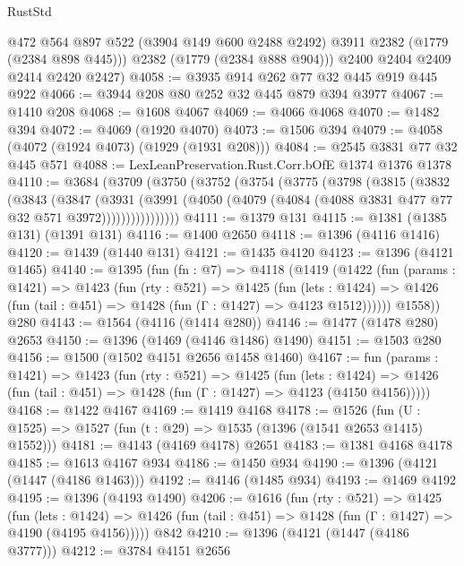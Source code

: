 \begin{lexlean}{RustStd}
\begin{coremodule}
{\begin{coremodule}
{{{{{{{{{{{          @472
          @564
          @897
          @522
          (@3904 @149 @600 @2488 @2492)
          @3911
          @2382
          (@1779 (@2384 @898 @445)))
        @2382
        (@1779 (@2384 @888 @904)))
      @2400
      @2404
      @2409
      @2414
      @2420
      @2427)
@4058 := @3935 @914 @262 @77 @32 @445 @919 @445 @922
@4066 := @3944 @208 @80 @252 @32 @445 @879 @394 @3977
@4067 := @1410 @208
@4068 := @1608 @4067
@4069 := @4066 @4068
@4070 := @1482 @394
@4072 := @4069 (@1920 @4070)
@4073 := @1506 @394
@4079 := @4058 (@4072 (@1924 @4073) (@1929 (@1931 @208)))
@4084 := @2545 @3831 @77 @32 @445 @571
@4088 := LexLeanPreservation.Rust.Corr.bOfE @1374 @1376 @1378
@4110 := @3684
    (@3709
      (@3750
        (@3752
          (@3754
            (@3775
              (@3798
                (@3815
                  (@3832
                    (@3843
                      (@3847
                        (@3931
                          (@3991
                            (@4050
                              (@4079 (@4084 (@4088 @3831 @477 @77 @32 @571 @3972))))))))))))))))
@4111 := @1379 @131
@4115 := @1381 (@1385 @131) (@1391 @131)
@4116 := @1400 @2650
@4118 := @1396 (@4116 @1416)
@4120 := @1439 (@1440 @131)
@4121 := @1435 @4120
@4123 := @1396 (@4121 @1465)
@4140 := @1395
    (fun (fn : @7) =>
    @4118
      (@1419
        (@1422
          (fun (params : @1421) =>
          @1423
            (fun (rty : @521) =>
            @1425
              (fun (lets : @1424) =>
              @1426 (fun (tail : @451) => @1428 (fun (Γ : @1427) => @4123 @1512))))))
        @1558))
    @280
@4143 := @1564 (@4116 (@1414 @280))
@4146 := @1477 (@1478 @280) @2653
@4150 := @1396 (@1469 (@4146 @1486) @1490)
@4151 := @1503 @280
@4156 := @1500 (@1502 @4151 @2656 @1458 @1460)
@4167 := fun (params : @1421) =>
  @1423
    (fun (rty : @521) =>
    @1425
      (fun (lets : @1424) =>
      @1426 (fun (tail : @451) => @1428 (fun (Γ : @1427) => @4123 (@4150 @4156)))))
@4168 := @1422 @4167
@4169 := @1419 @4168
@4178 := @1526 (fun (U : @1525) => @1527 (fun (t : @29) => @1535 (@1396 (@1541 @2653 @1415) @1552)))
@4181 := @4143 (@4169 @4178) @2651
@4183 := @1381 @4168 @4178
@4185 := @1613 @4167 @934
@4186 := @1450 @934
@4190 := @1396 (@4121 (@1447 (@4186 @1463)))
@4192 := @4146 (@1485 @934)
@4193 := @1469 @4192
@4195 := @1396 (@4193 @1490)
@4206 := @1616
    (fun (rty : @521) =>
    @1425
      (fun (lets : @1424) =>
      @1426 (fun (tail : @451) => @1428 (fun (Γ : @1427) => @4190 (@4195 @4156)))))
    @842
@4210 := @1396 (@4121 (@1447 (@4186 @3777)))
@4212 := @3784 @4151 @2656
}}}}}}}}}}}
\end{coremodule}}
\end{coremodule}
\end{lexlean}
